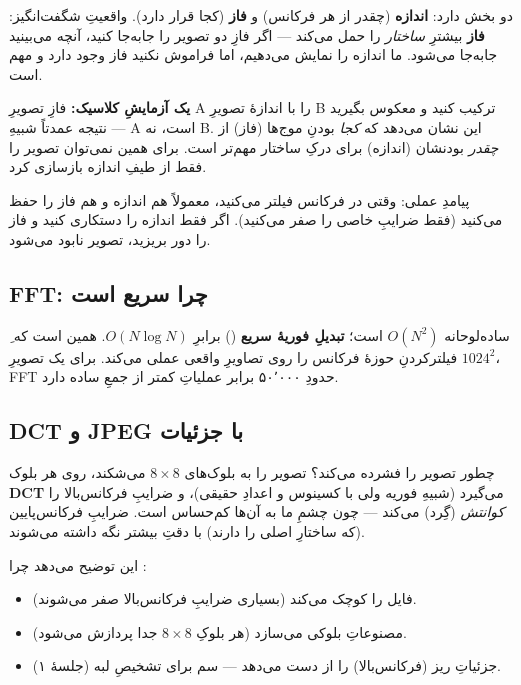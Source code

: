 \documentclass[12pt,a4paper]{article}
\begin{document}
 دو بخش دارد: \textbf{اندازه} (چقدر از هر فرکانس) و \textbf{فاز} (کجا قرار دارد). واقعیتِ
شگفت‌انگیز: \textbf{فاز} بیشترِ \emph{ساختار} را حمل می‌کند — اگر فازِ دو تصویر را جابه‌جا کنید،
آنچه می‌بینید جابه‌جا می‌شود. ما اندازه را نمایش می‌دهیم، اما فراموش نکنید فاز وجود دارد و مهم است.

\textbf{یک آزمایشِ کلاسیک:} فازِ تصویرِ A را با اندازهٔ تصویرِ B ترکیب کنید و معکوس بگیرید — نتیجه
عمدتاً شبیهِ A است، نه B. این نشان می‌دهد که \emph{کجا} بودنِ موج‌ها (فاز) از \emph{چقدر} بودنشان
(اندازه) برای درکِ ساختار مهم‌تر است. برای همین نمی‌توان تصویر را فقط از طیفِ اندازه بازسازی کرد.

\begin{yaddasht}
پیامدِ عملی: وقتی در فرکانس فیلتر می‌کنید، معمولاً هم اندازه و هم فاز را حفظ می‌کنید (فقط ضرایبِ
خاصی را صفر می‌کنید). اگر فقط اندازه را دستکاری کنید و فاز را دور بریزید، تصویر نابود می‌شود.
\end{yaddasht}

\subsection{FFT: چرا سریع است}

ِ ساده‌لوحانه $O(N^2)$ است؛ \textbf{تبدیلِ فوریهٔ سریع} () برابرِ $O(N\log N)$.
همین است که فیلترکردنِ حوزهٔ فرکانس را روی تصاویرِ واقعی عملی می‌کند. برای یک تصویرِ $1024^2$،
FFT حدودِ ۵۰٬۰۰۰ برابر عملیاتِ کمتر از جمعِ ساده دارد.

\subsection{DCT و JPEG با جزئیات}

 چطور تصویر را فشرده می‌کند؟ تصویر را به بلوک‌های $8\times8$ می‌شکند، روی هر بلوک
\textbf{DCT} می‌گیرد (شبیهِ فوریه ولی با کسینوس و اعدادِ حقیقی)، و ضرایبِ فرکانس‌بالا را
\emph{کوانتش} (گِرد) می‌کند — چون چشمِ ما به آن‌ها کم‌حساس است. ضرایبِ فرکانس‌پایین (که ساختارِ
اصلی را دارند) با دقتِ بیشتر نگه داشته می‌شوند.

این توضیح می‌دهد چرا :
\begin{itemize}
  \item فایل را کوچک می‌کند (بسیاری ضرایبِ فرکانس‌بالا صفر می‌شوند).
  \item مصنوعاتِ بلوکی می‌سازد (هر بلوکِ $8\times8$ جدا پردازش می‌شود).
  \item جزئیاتِ ریز (فرکانس‌بالا) را از دست می‌دهد — سم برای تشخیصِ لبه (جلسهٔ ۱).
\end{itemize}
\end{document}
